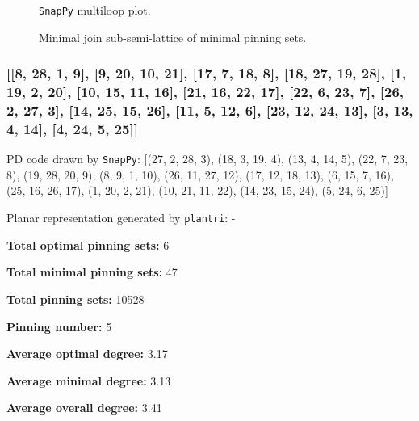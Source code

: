 \documentclass{article}%
\begin{document}
\begin{multicols}{2}
\begin{figure}[H]
\centering

\caption{\texttt{SnapPy} multiloop plot.}
\label{fig:tex/img/[[6, 22, 1, 7], [7, 15, 8, 14], [5, 13, 6, 14], [21, 16, 22, 17], [1, 16, 2, 15], [8, 23, 9, 28], [4, 27, 5, 28], [12, 17, 13, 18], [20, 24, 21, 25], [2, 24, 3, 23], [9, 3, 10, 4], [26, 18, 27, 19], [.svg}
\end{figure}
\columnbreak

\begin{figure}[H]
\centering
\scalebox{0.8}{}
\caption{Minimal join sub-semi-lattice of minimal pinning sets.}
\label{fig:tex/img/[[6, 22, 1, 7], [7, 15, 8, 14], [5, 13, 6, 14], [21, 16, 22, 17], [1, 16, 2, 15], [8, 23, 9, 28], [4, 27, 5, 28], [12, 17, 13, 18], [20, 24, 21, 25], [2, 24, 3, 23], [9, 3, 10, 4], [26, 18, 27, 19], [.pgf}
\end{figure}
\end{multicols}

\newpage

\subsubsection{[[8, 28, 1, 9], [9, 20, 10, 21], [17, 7, 18, 8], [18, 27, 19, 28], [1, 19, 2, 20], [10, 15, 11, 16], [21, 16, 22, 17], [22, 6, 23, 7], [26, 2, 27, 3], [14, 25, 15, 26], [11, 5, 12, 6], [23, 12, 24, 13], [3, 13, 4, 14], [4, 24, 5, 25]]}

{\small\noindent PD code drawn by \texttt{SnapPy}: [(27, 2, 28, 3), (18, 3, 19, 4), (13, 4, 14, 5), (22, 7, 23, 8), (19, 28, 20, 9), (8, 9, 1, 10), (26, 11, 27, 12), (17, 12, 18, 13), (6, 15, 7, 16), (25, 16, 26, 17), (1, 20, 2, 21), (10, 21, 11, 22), (14, 23, 15, 24), (5, 24, 6, 25)]}

{\small\noindent Planar representation generated by \texttt{plantri}: -}

\begin{multicols}{2}
{\normalsize \noindent\textbf{Total optimal pinning sets:} 6

\noindent\textbf{Total minimal pinning sets:} 47

\noindent\textbf{Total pinning sets:} 10528

\noindent\textbf{Pinning number:} 5

}
\columnbreak

{\normalsize \noindent\textbf{Average optimal degree:} 3.17

\noindent\textbf{Average minimal degree:} 3.13

\noindent\textbf{Average overall degree:} 3.41

}
\end{multicols}
\end{document}

